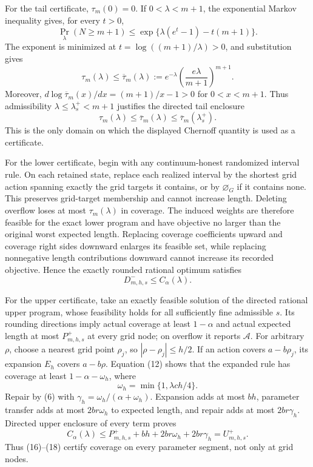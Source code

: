 For the tail certificate, \(\tau_m(0)=0\).  If \(0<\lambda<m+1\),
the exponential Markov inequality gives, for every \(t>0\),
\[
 \Pr_\lambda(N\ge m+1)
 \le\exp\{\lambda(e^t-1)-t(m+1)\}.
 \tag{13}
\]
The exponent is minimized at
\(t=\log((m+1)/\lambda)>0\), and substitution gives
\[
 \tau_m(\lambda)
 \le \overline\tau_m(\lambda)
 :=e^{-\lambda}\left(\frac{e\lambda}{m+1}\right)^{m+1}.
 \tag{14}
\]
Moreover,
\(d\log\overline\tau_m(x)/dx=(m+1)/x-1>0\) for
\(0<x<m+1\).  Thus admissibility
\(\lambda\le\lambda_s^+<m+1\) justifies the directed tail enclosure
\[
 \tau_m(\lambda)
 \le\overline\tau_m(\lambda)
 \le\overline\tau_m(\lambda_s^+).
 \tag{15}
\]
This is the only domain on which the displayed Chernoff quantity is
used as a certificate.

For the lower certificate, begin with any continuum-honest randomized
interval rule.  On each retained state, replace each realized interval
by the shortest grid action spanning exactly the grid targets it
contains, or by \(\varnothing_G\) if it contains none.  This preserves
grid-target membership and cannot increase length.  Deleting overflow
loses at most \(\tau_m(\lambda)\) in coverage.  The induced weights are
therefore feasible for the exact lower program and have objective no
larger than the original worst expected length.  Replacing coverage
coefficients upward and coverage right sides downward enlarges its
feasible set, while replacing nonnegative length contributions
downward cannot increase its recorded objective.  Hence the exactly
rounded rational optimum satisfies
\[
 D_{m,h,s}^-\le C_\alpha(\lambda).
 \tag{16}
\]

For the upper certificate, take an exactly feasible solution of the
directed rational upper program, whose feasibility holds for all
sufficiently fine admissible \(s\).  Its rounding directions imply
actual coverage at least \(1-\alpha\) and actual expected length at
most \(P_{m,h,s}^+\) at every grid node; on overflow it reports
\(\mathcal A\).  For arbitrary \(\rho\), choose a nearest grid point
\(\rho_j\), so \(|\rho-\rho_j|\le h/2\).  If an action covers
\(a-b\rho_j\), its expansion \(E_h\) covers \(a-b\rho\).  Equation
(12) shows that the expanded rule has coverage at least
\(1-\alpha-\omega_h\), where
\[
 \omega_h=\min\{1,\lambda ch/4\}.
 \tag{17}
\]
Repair by (6) with
\(\gamma_h=\omega_h/(\alpha+\omega_h)\).  Expansion adds at most
\(bh\), parameter transfer adds at most \(2br\omega_h\) to expected
length, and repair adds at most \(2br\gamma_h\).  Directed upper
enclosure of every term proves
\[
 C_\alpha(\lambda)
 \le P_{m,h,s}^++bh+2br\omega_h+2br\gamma_h
 =U_{m,h,s}^+.
 \tag{18}
\]
Thus (16)--(18) certify coverage on every parameter segment, not only
at grid nodes.

